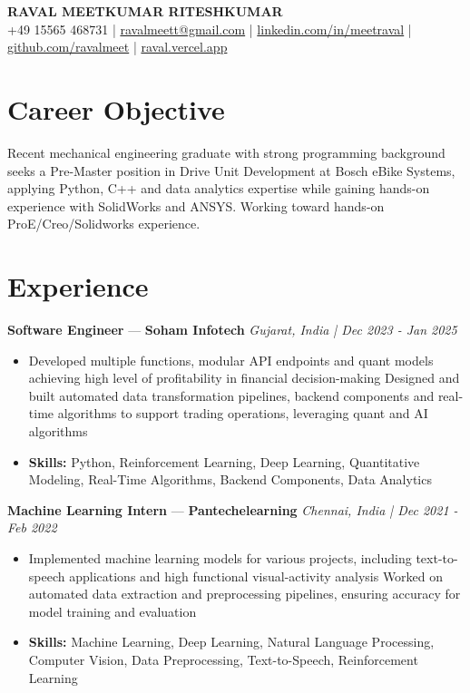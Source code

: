 \documentclass[a4paper,10pt]{article}
\begin{document}
\begin{center}
  {\Large\bfseries RAVAL MEETKUMAR RITESHKUMAR}\\[2pt]
  {\small +49 15565 468731 \;|\; \href{mailto:ravalmeett@gmail.com}{ravalmeett@gmail.com} \;|\; \href{https://www.linkedin.com/in/meetraval/}{linkedin.com/in/meetraval} \;|\; \href{https://github.com/ravalmeet}{github.com/ravalmeet} \;|\; \href{https://raval.vercel.app/}{raval.vercel.app}}
\end{center}
\vspace{-3pt}

\section*{Career Objective}
Recent mechanical engineering graduate with strong programming background seeks a Pre-Master position in Drive Unit Development at Bosch eBike Systems, applying Python, C++ and data analytics expertise while gaining hands-on experience with SolidWorks and ANSYS. Working toward hands-on ProE/Creo/Solidworks experience.\par

\section*{Experience}
\textbf{Software Engineer} — \textbf{Soham Infotech} \hfill \textit{Gujarat, India \;|\; Dec 2023 - Jan 2025}\par
\vspace{1pt}
\begin{itemize}
  \item Developed multiple functions, modular API endpoints and quant models achieving high level of profitability in financial decision-making Designed and built automated data transformation pipelines, backend components and real-time algorithms to support trading operations, leveraging quant and AI algorithms
  \item \textbf{Skills:} Python, Reinforcement Learning, Deep Learning, Quantitative Modeling, Real-Time Algorithms, Backend Components, Data Analytics
\end{itemize}
\vspace{3pt}
\textbf{Machine Learning Intern} — \textbf{Pantechelearning} \hfill \textit{Chennai, India \;|\; Dec 2021 - Feb 2022}\par
\vspace{1pt}
\begin{itemize}
  \item Implemented machine learning models for various projects, including text-to-speech applications and high functional visual-activity analysis Worked on automated data extraction and preprocessing pipelines, ensuring accuracy for model training and evaluation
  \item \textbf{Skills:} Machine Learning, Deep Learning, Natural Language Processing, Computer Vision, Data Preprocessing, Text-to-Speech, Reinforcement Learning
\end{itemize}
\end{document}
